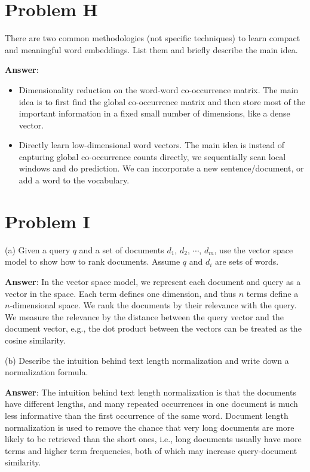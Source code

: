 \documentclass{article}
\begin{document}
\section{Problem H}
There are two common methodologies (not specific techniques) to learn compact and meaningful word embeddings. List them and briefly describe the main idea.

{\bf Answer}:
\begin{itemize}
\item Dimensionality reduction on the word-word co-occurrence matrix. The main idea is to first find the global co-occurrence matrix and then store most of the important information in a fixed small number of dimensions, like a dense vector.
\item Directly learn low-dimensional word vectors. The main idea is instead of capturing global co-occurrence counts directly, we sequentially scan local windows and do prediction. We can incorporate a new sentence/document, or add a word to the vocabulary.
\end{itemize}

\section{Problem I}
(a) Given a query $q$ and a set of documents $d_1$, $d_2$, $\cdots$, $d_m$, use the vector space model to show how to rank documents. Assume $q$ and $d_i$ are sets of words.

{\bf Answer}:
In the vector space model, we represent each document and query as a vector in the space. Each term defines one dimension, and thus $n$ terms define a $n$-dimensional space. We rank the documents by their relevance with the query. We measure the relevance by the distance between the query vector and the document vector, e.g., the dot product between the vectors can be treated as the cosine similarity.

(b) Describe the intuition behind text length normalization and write down a normalization formula.

{\bf Answer}:
The intuition behind text length normalization is that the documents have different lengths, and many repeated occurrences in one document is much less informative than the first occurrence of the same word. Document length normalization is used to remove the chance that very long documents are more likely to be retrieved than the short ones, i.e., long documents usually have more terms and higher term frequencies, both of which may increase query-document similarity.
\end{document}
